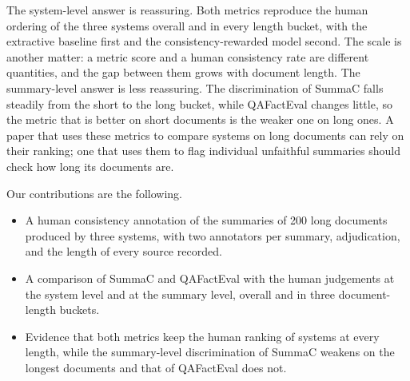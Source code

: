 The system-level answer is reassuring. Both metrics reproduce the human ordering of the three systems overall and in every length bucket, with the extractive baseline first and the consistency-rewarded model second. The scale is another matter: a metric score and a human consistency rate are different quantities, and the gap between them grows with document length. The summary-level answer is less reassuring. The discrimination of SummaC falls steadily from the short to the long bucket, while QAFactEval changes little, so the metric that is better on short documents is the weaker one on long ones. A paper that uses these metrics to compare systems on long documents can rely on their ranking; one that uses them to flag individual unfaithful summaries should check how long its documents are.

Our contributions are the following.
\begin{itemize}
\item A human consistency annotation of the summaries of 200 long documents produced by three systems, with two annotators per summary, adjudication, and the length of every source recorded.
\item A comparison of SummaC and QAFactEval with the human judgements at the system level and at the summary level, overall and in three document-length buckets.
\item Evidence that both metrics keep the human ranking of systems at every length, while the summary-level discrimination of SummaC weakens on the longest documents and that of QAFactEval does not.
\end{itemize}
